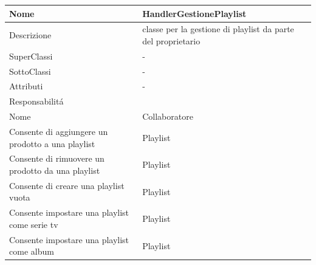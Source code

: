 \begin{center} 
    \begin{longtable}{ |p{3cm}|p{3cm}|p{3cm}|p{3cm}| }
        \hline
        Nome & \multicolumn{3}{|p{9cm}|}{HandlerGestionePlaylist} \\\hline
        Descrizione & \multicolumn{3}{|p{9cm}|}{classe per la gestione di playlist da parte del proprietario} \\\hline
        SuperClassi & \multicolumn{3}{|p{9cm}|}{-} \\\hline
        SottoClassi & \multicolumn{3}{|p{9cm}|}{-} \\\hline
        Attributi & \multicolumn{3}{|p{9cm}|}{-} \\\hline
        \multicolumn{4}{|p{12cm}|}{Responsabilit\'a} \\\hline %
        \multicolumn{2}{|p{6cm}|}{Nome} & \multicolumn{2}{|p{6cm}|}{Collaboratore} \\\hline
        \multicolumn{2}{|p{6cm}|}{Consente di aggiungere un prodotto a una playlist} & \multicolumn{2}{|p{6cm}|}{Playlist} \\\hline
        \multicolumn{2}{|p{6cm}|}{Consente di rimuovere un prodotto da una playlist} & \multicolumn{2}{|p{6cm}|}{Playlist} \\\hline
        \multicolumn{2}{|p{6cm}|}{Consente di creare una playlist vuota} & \multicolumn{2}{|p{6cm}|}{Playlist} \\\hline
        \multicolumn{2}{|p{6cm}|}{Consente impostare una playlist come serie tv} & \multicolumn{2}{|p{6cm}|}{Playlist} \\\hline
        \multicolumn{2}{|p{6cm}|}{Consente impostare una playlist come album} & \multicolumn{2}{|p{6cm}|}{Playlist} \\\hline
    \end{longtable}
\end{center}


